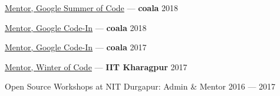 \href{https://docs.naveenkumarsangi.me/gsoc-mentor.pdf}{Mentor, Google Summer of Code} --- \textbf{coala} \hfill 2018

\href{https://docs.naveenkumarsangi.me/gci-mentor-2018.pdf}{Mentor, Google Code-In} --- \textbf{coala} \hfill 2018

\href{https://docs.naveenkumarsangi.me/gci-mentor-2017.pdf}{Mentor, Google Code-In} --- \textbf{coala} \hfill 2017

\href{https://docs.naveenkumarsangi.me/kwoc.jpg}{Mentor, Winter of Code} --- \textbf{IIT Kharagpur} \hfill 2017

Open Source Workshops at NIT Durgapur: Admin \& Mentor \hfill 2016 --- 2017

